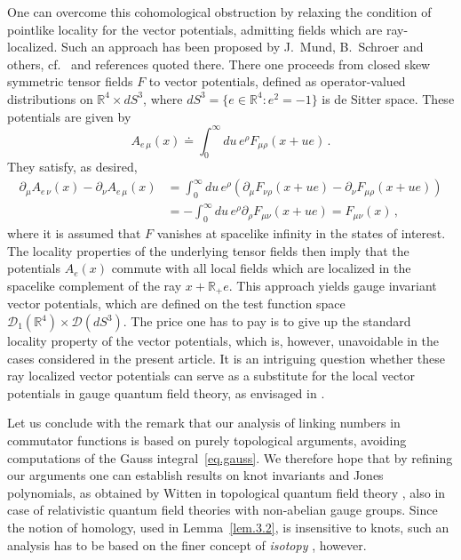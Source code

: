 \documentclass[11pt]{article}
\numberwithin{equation}{section}
\newcommand{\RR}{{\mathbb R}}
\newcommand{\Dc}{{\mathcal{D}}}
\begin{document}
\medskip
One can overcome this cohomological obstruction by relaxing the 
condition of pointlike locality for the vector potentials, admitting 
fields which are ray-localized. Such an approach   
has been proposed by J.~Mund, B.~Schroer and others, cf.~\cite{MuOl} 
and references quoted there. There 
one proceeds from closed skew symmetric tensor fields $F$
to vector potentials, defined as operator-valued 
distributions on $\RR^4 \times dS^3$,
where $dS^3 = \{ e \in \RR^4 : e^2 = -1 \}$ is de Sitter space.
These potentials are given by  
$$
A_{e \, \mu}(x) \doteq \int_0^\infty \!  du \, e^\rho F_{\mu \rho}(x + ue) \, .
$$ 
They satisfy, as desired,  
\begin{align*}
\partial_\mu A_{e \, \nu}(x) - \partial_\nu A_{e \, \mu}(x)
& = \int_0^\infty \!  du \, e^\rho (\partial_\mu F_{\nu \rho}(x + ue) 
- \partial_\nu F_{\mu \rho}(x + ue))  \\
& = - 
\int_0^\infty \!  du \, e^\rho \partial_\rho 
F_{\mu \nu}(x + ue) = F_{\mu \nu}(x) \, ,
\end{align*}
where it is assumed that $F$ vanishes at spacelike infinity
in the states of interest. The locality properties of the underlying
tensor fields then imply that the potentials 
$A_e(x)$ commute with all local fields which 
are localized in the spacelike complement of the 
ray $x + \RR_+ e$. This approach yields gauge invariant 
vector potentials, which are defined on the test function space 
$\Dc_1(\RR^4) \times \Dc(dS^3)$. The price one has 
to pay is to give up the standard locality property of the
vector potentials, which is, however, unavoidable in the cases 
considered in the present article. It is an intriguing question 
whether these ray localized vector potentials can serve as a
substitute for the local vector potentials in gauge quantum field 
theory, as envisaged in \cite{Sch}. 

\medskip
Let us conclude with the remark that our  
analysis of linking numbers in commutator functions is based on 
purely topological arguments, avoiding computations
of the Gauss integral~\eqref{eq.gauss}. 
We therefore hope that by refining our arguments 
one can establish results on knot invariants and Jones polynomials,  
as obtained by Witten in topological quantum field theory \cite{Witten},  
also in case of relativistic quantum field theories with non-abelian
gauge groups. Since the notion of homology, used in Lemma~\ref{lem.3.2}, 
is insensitive to knots, such an analysis has to be based on the 
finer concept of \emph{isotopy} \cite{BaMu,Spera}, however.  
\end{document}
